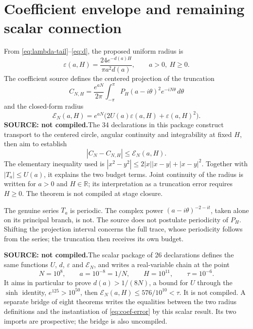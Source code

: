 \documentclass[11pt,a4paper]{article}
\theoremstyle{remark}
\newcommand{\R}{\mathbb R}
\newcommand{\source}{\textbf{SOURCE: not compiled.}\space}
\begin{document}
\section{Coefficient envelope and remaining scalar connection}\label{sec:radius}
From \eqref{eq:lambda-tail}--\eqref{eq:d}, the proposed uniform radius is
\begin{equation}\label{eq:eps}
\varepsilon(a,H)=\frac{24e^{-d(a)H}}{\pi a^2d(a)},\qquad a>0,\ H\ge0.
\end{equation}
The coefficient source defines the centered projection of the truncation
\[
C_{N,H}=\frac{e^{aN}}{2\pi}\int_{-\pi}^{\pi}
P_H(a-i\theta)^2e^{-iN\theta}\,d\theta
\]
and the closed-form radius
\begin{equation}\label{eq:E-mellin}
\mathcal E_N(a,H)=e^{aN}\bigl(2U(a)\varepsilon(a,H)
+\varepsilon(a,H)^2\bigr).
\end{equation}
\source The 34 declarations in this package construct transport to the
centered circle, angular continuity and integrability at fixed $H$, then
aim to establish
\begin{equation}\label{eq:coef-error}
|C_N-C_{N,H}|\le\mathcal E_N(a,H).
\end{equation}
The elementary inequality used is
$|x^2-y^2|\le2|x||x-y|+|x-y|^2$. Together with $|T_a|\le U(a)$, it explains
the two budget terms. Joint continuity of the radius is written for $a>0$
and $H\in\R$; its interpretation as a truncation error requires $H\ge0$.
The theorem is not compiled at stage closure.

The genuine series $T_a$ is periodic. The complex power
$(a-i\theta)^{-2-it}$, taken alone on its principal branch, is not.
The source does not postulate periodicity of $P_H$. Shifting the projection
interval concerns the full trace, whose periodicity follows from the series;
the truncation then receives its own budget.

\source The scalar package of 26 declarations defines the same functions
$U$, $d$, $\varepsilon$ and $\mathcal E_N$, and writes a real-variable
chain at the point
\begin{equation}\label{eq:point}
N=10^8,\qquad a=10^{-8}=1/N,\qquad H=10^{11},\qquad\tau=10^{-6}.
\end{equation}
It aims in particular to prove $d(a)>1/(8N)$, a bound for $U$ through the
$\sinh$ identity, $e^{125}>10^{50}$, then
$\mathcal E_N(a,H)\le576/10^{10}<\tau$.
It is not compiled. A separate bridge of eight theorems writes the equalities
between the two radius definitions and the instantiation of
\eqref{eq:coef-error} by this scalar result. Its two imports are prospective;
the bridge is also uncompiled.
\end{document}
